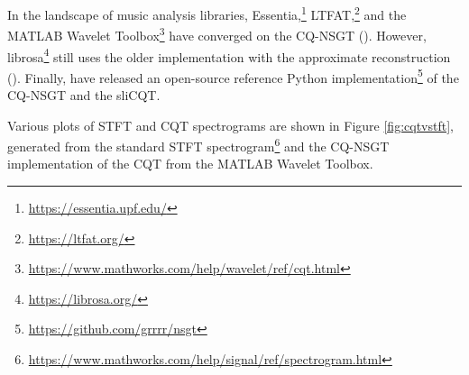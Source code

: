 \documentclass[report.tex]{subfiles}
\begin{document}
In the landscape of music analysis libraries, Essentia,\footnote{\url{https://essentia.upf.edu/}} LTFAT,\footnote{\url{https://ltfat.org/}} and the MATLAB Wavelet Toolbox\footnote{\url{https://www.mathworks.com/help/wavelet/ref/cqt.html}} have converged on the CQ-NSGT (\cite{invertiblecqt, slicq, variableq1}). However, librosa\footnote{\url{https://librosa.org/}} still uses the older implementation with the approximate reconstruction (\cite{klapuricqt}). Finally, \textcite{invertiblecqt} have released an open-source reference Python implementation\footnote{\url{https://github.com/grrrr/nsgt}} of the CQ-NSGT and the sliCQT.

Various plots of STFT and CQT spectrograms are shown in Figure \ref{fig:cqtvstft}, generated from the standard STFT spectrogram\footnote{\url{https://www.mathworks.com/help/signal/ref/spectrogram.html}} and the CQ-NSGT implementation of the CQT from the MATLAB Wavelet Toolbox.
\end{document}

